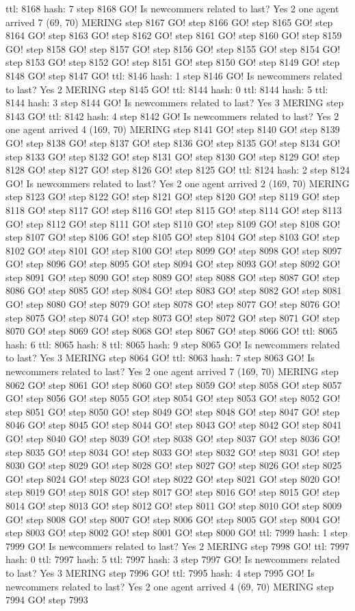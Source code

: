 ttl: 8168 hash: 7 step 8168 GO! Is newcommers related to last? Yes 2 one agent arrived 7 (69, 70) MERING step 8167 GO! step 8166 GO! step 8165 GO! step 8164 GO! step 8163 GO! step 8162 GO! step 8161 GO! step 8160 GO! step 8159 GO! step 8158 GO! step 8157 GO! step 8156 GO! step 8155 GO! step 8154 GO! step 8153 GO! step 8152 GO! step 8151 GO! step 8150 GO! step 8149 GO! step 8148 GO! step 8147 GO! ttl: 8146 hash: 1 step 8146 GO! Is newcommers related to last? Yes 2 MERING step 8145 GO! ttl: 8144 hash: 0 ttl: 8144 hash: 5 ttl: 8144 hash: 3 step 8144 GO! Is newcommers related to last? Yes 3 MERING step 8143 GO! ttl: 8142 hash: 4 step 8142 GO! Is newcommers related to last? Yes 2 one agent arrived 4 (169, 70) MERING step 8141 GO! step 8140 GO! step 8139 GO! step 8138 GO! step 8137 GO! step 8136 GO! step 8135 GO! step 8134 GO! step 8133 GO! step 8132 GO! step 8131 GO! step 8130 GO! step 8129 GO! step 8128 GO! step 8127 GO! step 8126 GO! step 8125 GO! ttl: 8124 hash: 2 step 8124 GO! Is newcommers related to last? Yes 2 one agent arrived 2 (169, 70) MERING step 8123 GO! step 8122 GO! step 8121 GO! step 8120 GO! step 8119 GO! step 8118 GO! step 8117 GO! step 8116 GO! step 8115 GO! step 8114 GO! step 8113 GO! step 8112 GO! step 8111 GO! step 8110 GO! step 8109 GO! step 8108 GO! step 8107 GO! step 8106 GO! step 8105 GO! step 8104 GO! step 8103 GO! step 8102 GO! step 8101 GO! step 8100 GO! step 8099 GO! step 8098 GO! step 8097 GO! step 8096 GO! step 8095 GO! step 8094 GO! step 8093 GO! step 8092 GO! step 8091 GO! step 8090 GO! step 8089 GO! step 8088 GO! step 8087 GO! step 8086 GO! step 8085 GO! step 8084 GO! step 8083 GO! step 8082 GO! step 8081 GO! step 8080 GO! step 8079 GO! step 8078 GO! step 8077 GO! step 8076 GO! step 8075 GO! step 8074 GO! step 8073 GO! step 8072 GO! step 8071 GO! step 8070 GO! step 8069 GO! step 8068 GO! step 8067 GO! step 8066 GO! ttl: 8065 hash: 6 ttl: 8065 hash: 8 ttl: 8065 hash: 9 step 8065 GO! Is newcommers related to last? Yes 3 MERING step 8064 GO! ttl: 8063 hash: 7 step 8063 GO! Is newcommers related to last? Yes 2 one agent arrived 7 (169, 70) MERING step 8062 GO! step 8061 GO! step 8060 GO! step 8059 GO! step 8058 GO! step 8057 GO! step 8056 GO! step 8055 GO! step 8054 GO! step 8053 GO! step 8052 GO! step 8051 GO! step 8050 GO! step 8049 GO! step 8048 GO! step 8047 GO! step 8046 GO! step 8045 GO! step 8044 GO! step 8043 GO! step 8042 GO! step 8041 GO! step 8040 GO! step 8039 GO! step 8038 GO! step 8037 GO! step 8036 GO! step 8035 GO! step 8034 GO! step 8033 GO! step 8032 GO! step 8031 GO! step 8030 GO! step 8029 GO! step 8028 GO! step 8027 GO! step 8026 GO! step 8025 GO! step 8024 GO! step 8023 GO! step 8022 GO! step 8021 GO! step 8020 GO! step 8019 GO! step 8018 GO! step 8017 GO! step 8016 GO! step 8015 GO! step 8014 GO! step 8013 GO! step 8012 GO! step 8011 GO! step 8010 GO! step 8009 GO! step 8008 GO! step 8007 GO! step 8006 GO! step 8005 GO! step 8004 GO! step 8003 GO! step 8002 GO! step 8001 GO! step 8000 GO! ttl: 7999 hash: 1 step 7999 GO! Is newcommers related to last? Yes 2 MERING step 7998 GO! ttl: 7997 hash: 0 ttl: 7997 hash: 5 ttl: 7997 hash: 3 step 7997 GO! Is newcommers related to last? Yes 3 MERING step 7996 GO! ttl: 7995 hash: 4 step 7995 GO! Is newcommers related to last? Yes 2 one agent arrived 4 (69, 70) MERING step 7994 GO! step 7993 